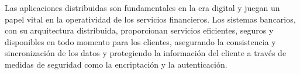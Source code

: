\begin{tcolorbox}[colback=yellow!10!white, colframe=green!50!black, title=Resumiendo]
	Las aplicaciones distribuidas son fundamentales en la era digital y juegan un papel vital en la operatividad de los servicios financieros. Los sistemas bancarios, con su arquitectura distribuida, proporcionan servicios eficientes, seguros y disponibles en todo momento para los clientes, asegurando la consistencia y sincronización de los datos y protegiendo la información del cliente a través de medidas de seguridad como la encriptación y la autenticación.
\end{tcolorbox}
